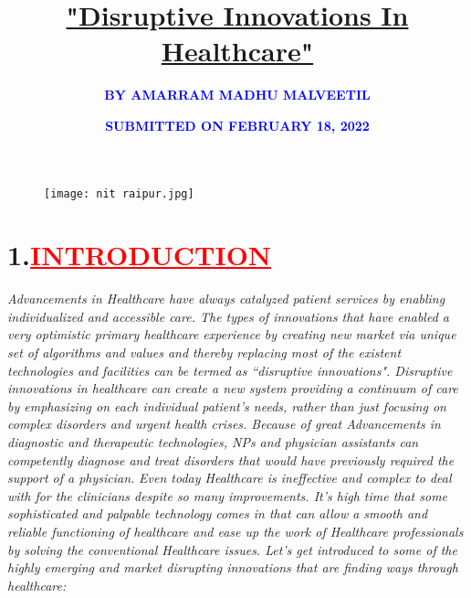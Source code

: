 \documentclass[12pt]{article}
\title{\textbf{\textcolor{PineGreen}{\underline{"Disruptive Innovations In Healthcare" }}}}
\author{\textbf{\textcolor{Blue}{BY AMARRAM MADHU MALVEETIL}}}
\affil[]{\textcolor{Blue}{\textbf{ROLL NO.:21111009}}}
\affil[]{\textbf{\textcolor{Brown}{"Department of BIOMEDICAL ENGINEERING"}}}
\affil[]{\textbf{\textcolor{RedViolet}{"NATIONAL INSTITUTE OF TECHNOLOGY, RAIPUR", CHATTISGARH"}}}
\affil[]{\textbf{\textcolor{Blue}{BATCH:2025\hspace{2cm}SEMESTER:I}}}
\affil[]{\textbf{\textcolor{Maroon}{Assignment 4 of"BASIC BIOMEDICAL ENGINEERING"}}}
\date{\textbf{\textcolor{Blue}{SUBMITTED ON FEBRUARY 18, 2022}}}
\begin{document}
\begin{figure}
    \centering
    \texttt{[image: nit raipur.jpg]}
\end{figure}
\maketitle

\section*{\textbf{1.\hspace{1cm}\textcolor{red}{\underline{\huge{INTRODUCTION}}}}}
\hspace{1cm}\large{\emph{Advancements in Healthcare have always catalyzed  patient services by enabling individualized and accessible care. The types of innovations that have enabled a very optimistic primary healthcare experience by creating new market via unique set of algorithms and values and thereby replacing most of the existent technologies and facilities can be termed as “disruptive innovations". Disruptive innovations in healthcare can create a new system providing a continuum of care by emphasizing on each individual patient's needs, rather than just focusing on complex disorders and urgent health crises. Because of great Advancements in diagnostic and therapeutic technologies, NPs and physician assistants can competently diagnose and treat disorders that would have previously required the support of a physician.\vspace{1cm}\newline}} 
\hspace{1cm}\large{\emph{Even today Healthcare is ineffective and complex to deal with for the clinicians despite so many improvements. It's high time that some sophisticated and palpable technology comes in that can allow a smooth and reliable functioning of healthcare and ease up the work of Healthcare professionals by solving the conventional Healthcare issues. Let's get introduced to some of the highly emerging and market disrupting innovations that are finding ways through healthcare:}}
\newpage
\end{document}
